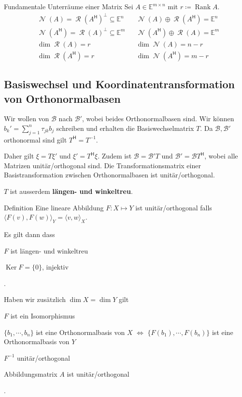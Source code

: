 \documentclass[a4paper,10pt]{article}
\DeclareMathOperator{\Rank}{Rank}
\DeclareMathOperator{\Columnspace}{\mathcal{R}}
\DeclareMathOperator{\Nullspace}{\mathcal{N}}
\DeclareMathOperator{\Kernel}{Ker}
\newcommand*{\hermconj}{\mathsf{H}}
\def\E{\mathbb{E}}
\begin{document}
\begin{mainbox}{Fundamentale Unterräume einer Matrix}
  Sei $A \in \E^{m \times n}$ mit $r \coloneqq \Rank A$.
  \begin{align*}
    & \Nullspace(A) = \Columnspace(A^\hermconj)^\perp \subseteq \E^n & & \Nullspace(A) \oplus \Columnspace(A^\hermconj) = \E^n\\
    & \Nullspace(A^\hermconj) = \Columnspace(A)^\perp \subseteq \E^m & & \Nullspace(A^\hermconj) \oplus \Columnspace(A) = \E^m\\
    & \dim \Columnspace(A) = r & & \dim \Nullspace(A) = n - r\\
    & \dim \Columnspace(A^\hermconj) = r & & \dim \Nullspace(A^\hermconj) = m - r
  \end{align*}
\end{mainbox}

\subsection{Basiswechsel und Koordinatentransformation von Orthonormalbasen}

Wir wollen von $\mathcal{B}$ nach $\mathcal{B}'$, wobei beides Orthonormalbasen sind. Wir können $b_k' = \sum_{j=1}^n \tau_{jk} b_j$ schreiben und erhalten die Basiswechselmatrix $T$. Da $\mathcal{B}, \mathcal{B}'$ orthonormal sind gilt $T^\hermconj = T^{-1}$.

Daher gilt $\xi = T \xi'$ und $\xi' = T^\hermconj \xi$. Zudem ist $\mathcal{B} = \mathcal{B}' T$ und $\mathcal{B}' = \mathcal{B} T^\hermconj$, wobei alle Matrizen unitär/orthogonal sind. Die Transformationsmatrix einer Basistransformation zwischen Orthonormalbasen ist unitär/orthogonal.

$T$ ist ausserdem \textbf{längen- und winkeltreu}. 

\begin{mainbox}{Definition}
  Eine lineare Abbildung $F: X \mapsto Y$ ist unitär/orthogonal falls $\langle F(v), F(w) \rangle_Y = \langle v, w \rangle_X$.
\end{mainbox}

Es gilt dann dass \begin{rowlist}
  \item $F$ ist längen- und winkeltreu
  \item $\Kernel F = \{0\}$, injektiv
\end{rowlist}.

Haben wir zusätzlich $\dim X = \dim Y$ gilt \begin{rowlist}
  \item $F$ ist ein Isomorphismus
  \item $\{b_1, \cdots, b_n\}$ ist eine Orthonormalbasis von $X$ $\iff$ $\{F(b_1), \cdots, F(b_n)\}$ ist eine Orthonormalbasis von $Y$
  \item $F^{-1}$ unitär/orthogonal
  \item Abbildungsmatrix $A$ ist unitär/orthogonal
\end{rowlist}.
\end{document}
